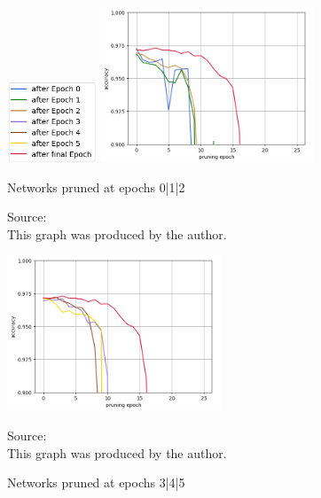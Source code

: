 \newpage
\begin{figure}
	\begin{minipage}{\textwidth}
		\centering
		\includegraphics[width=100px]{gfx/7-Evaluation/LTH_5_legend.png}
	\end{minipage}
	\begin{minipage}{0.45\textwidth}
		\centering
		\includegraphics[height=175px]{gfx/Experiments/EarlyTicket-MNIST-FCN/012.png}
		\caption{Networks pruned at epochs 0|1|2}
		\vspace{7pt}
		\footnotesize{
			Source:\\
			This graph was produced by the author.
		}
		\label{fig:Early-Tickets-0}
	\end{minipage}\hfill
	\begin{minipage}{0.45\textwidth}
		\centering
		\includegraphics[height=175px]{gfx/Experiments/EarlyTicket-MNIST-FCN/345.png}
		\caption{Networks pruned at epochs 3|4|5}
		\vspace{7pt}
		\footnotesize{
			Source:\\
			This graph was produced by the author.
		}
		\label{fig:Early-Tickets-4}
	\end{minipage}
\end{figure}
